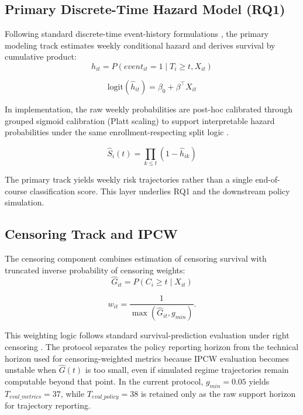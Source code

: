 \subsection{Primary Discrete-Time Hazard Model (RQ1)}

Following standard discrete-time event-history formulations \cite{SingerWillett1993DiscreteTimeSurvival,Allison1982DiscreteTimeMethods}, the primary modeling track estimates weekly conditional hazard and derives survival by cumulative product:
\begin{equation}
\label{eq:hazard_weekly}
h_{it}=P(event_{it}=1 \mid T_i\ge t, X_{it})
\end{equation}

\begin{equation*}
\text{logit}(\hat h_{it})=\beta_0+\beta^\top X_{it}
\end{equation*}

In implementation, the raw weekly probabilities are post-hoc calibrated through grouped sigmoid calibration (Platt scaling) to support interpretable hazard probabilities under the same enrollment-respecting split logic \cite{Platt1999ProbabilisticOutputs}.

\begin{equation}
\label{eq:survival_product}
\hat S_i(t)=\prod_{k\le t}(1-\hat h_{ik})
\end{equation}

The primary track yields weekly risk trajectories rather than a single end-of-course classification score. This layer underlies RQ1 and the downstream policy simulation.

\subsection{Censoring Track and IPCW}

The censoring component combines estimation of censoring survival with truncated inverse probability of censoring weights:
\begin{equation*}
\hat G_{it}=P(C_i\ge t \mid X_{it})
\end{equation*}

\begin{equation*}
w_{it}=\frac{1}{\max(\hat G_{it}, g_{min})}.
\end{equation*}

This weighting logic follows standard survival-prediction evaluation under right censoring \cite{Graf1999AssessmentSurvivalPrediction,Gerds2006ConsistentBrier}. The protocol separates the policy reporting horizon from the technical horizon used for censoring-weighted metrics because IPCW evaluation becomes unstable when $\hat G(t)$ is too small, even if simulated regime trajectories remain computable beyond that point. In the current protocol, $g_{min}=0.05$ yields $T_{eval\_metrics}=37$, while $T_{eval\_policy}=38$ is retained only as the raw support horizon for trajectory reporting.

